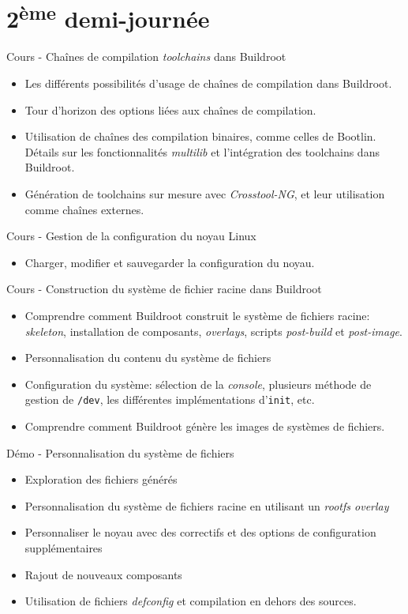 \documentclass[a4paper,12pt,obeyspaces,spaces,hyphens]{article}
\begin{document}
\section{2\textsuperscript{ème} demi-journée}

\feagendaonecolumn
{Cours - Chaînes de compilation {\em toolchains} dans Buildroot}
{
  \begin{itemize}
  \item Les différents possibilités d'usage de chaînes de compilation
	dans Buildroot.
  \item Tour d'horizon des options liées aux chaînes de compilation.
  \item Utilisation de chaînes des compilation binaires, comme
	celles de Bootlin. Détails sur les fonctionnalités
        {\em multilib} et l'intégration des toolchains dans Buildroot.
  \item Génération de toolchains sur mesure avec {\em Crosstool-NG},
	et leur utilisation comme chaînes externes.
  \end{itemize}
}

\feagendatwocolumn
{Cours - Gestion de la configuration du noyau Linux}
{
  \begin{itemize}
  \item Charger, modifier et sauvegarder la configuration du noyau.
  \end{itemize}
}
{Cours - Construction du système de fichier racine dans Buildroot}
{
  \begin{itemize}
  \item Comprendre comment Buildroot construit le système de fichiers
	racine: {\em skeleton}, installation de composants, {\em
        overlays}, scripts {\em post-build} et {\em post-image}.
  \item Personnalisation du contenu du système de fichiers
  \item Configuration du système: sélection de la {\em console},
	plusieurs méthode de gestion de {\tt /dev}, les différentes
	implémentations d'{\tt init}, etc.
  \item Comprendre comment Buildroot génère les images de systèmes de
	fichiers.
  \end{itemize}
}

\feagendaonecolumn
{Démo - Personnalisation du système de fichiers}
{
  \begin{itemize}
  \item Exploration des fichiers générés
  \item Personnalisation du système de fichiers racine en utilisant un {\em rootfs overlay}
  \item Personnaliser le noyau avec des correctifs et des options de
	configuration supplémentaires
  \item Rajout de nouveaux composants
  \item Utilisation de fichiers {\em defconfig} et compilation en
	dehors des sources.
  \end{itemize}
}
\end{document}
